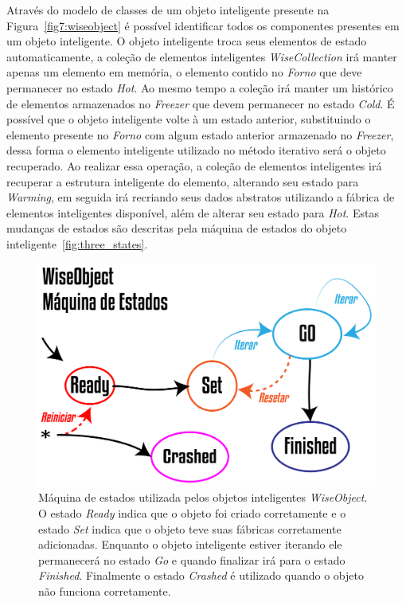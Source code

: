 Através do modelo de classes de um objeto inteligente presente na Figura~\ref{fig7:wiseobject} é possível identificar todos os componentes presentes em um objeto inteligente. O objeto inteligente troca seus elementos de estado automaticamente, a coleção de elementos inteligentes \textit{WiseCollection} irá manter apenas um elemento em memória, o elemento contido no \textit{Forno} que deve permanecer no estado \textit{Hot}. Ao mesmo tempo a coleção irá manter um histórico de elementos armazenados no \textit{Freezer} que devem permanecer no estado \textit{Cold}. É possível que o objeto inteligente volte à um estado anterior, substituindo o elemento presente no \textit{Forno} com algum estado anterior armazenado no \textit{Freezer}, dessa forma o elemento inteligente utilizado no método iterativo será o objeto recuperado. Ao realizar essa operação, a coleção de elementos inteligentes irá recuperar a estrutura inteligente do elemento, alterando seu estado para \textit{Warming}, em seguida irá recriando seus dados abstratos utilizando a fábrica de elementos inteligentes disponível, além de alterar seu estado para \textit{Hot}. Estas mudanças de estados são descritas pela máquina de estados do objeto inteligente~\ref{fig:three_states}.

\begin{figure}[!htbp]
	\centering
	\includegraphics[scale=2]{Figures/WiseObjectStatus@16x.png}
	\caption{Máquina de estados utilizada pelos objetos inteligentes \textit{WiseObject}. O estado \textit{Ready} indica que o objeto foi criado corretamente e o estado \textit{Set} indica que o objeto teve suas fábricas corretamente adicionadas. Enquanto o objeto inteligente estiver iterando ele permanecerá no estado \textit{Go} e quando finalizar irá para o estado \textit{Finished}. Finalmente o estado \textit{Crashed} é utilizado quando o objeto não funciona corretamente.}
	\label{fig7:wiseobjectstatuses}
\end{figure}

